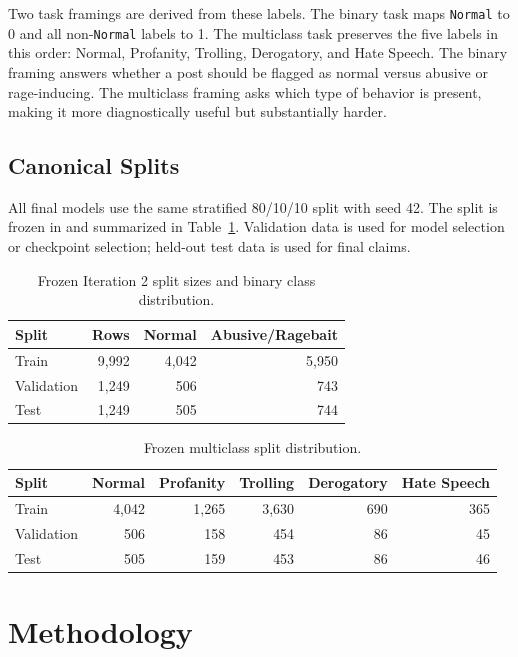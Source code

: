 \documentclass[11pt]{article}
\begin{document}
Two task framings are derived from these labels. The binary task maps \texttt{Normal} to 0 and all non-\texttt{Normal} labels to 1. The multiclass task preserves the five labels in this order: Normal, Profanity, Trolling, Derogatory, and Hate Speech. The binary framing answers whether a post should be flagged as normal versus abusive or rage-inducing. The multiclass framing asks which type of behavior is present, making it more diagnostically useful but substantially harder.

\subsection{Canonical Splits}

All final models use the same stratified 80/10/10 split with seed 42. The split is frozen in  and summarized in Table~\ref{tab:splits}. Validation data is used for model selection or checkpoint selection; held-out test data is used for final claims.

\begin{table}[H]
\centering
\caption{Frozen Iteration 2 split sizes and binary class distribution.}
\label{tab:splits}
\begin{tabular}{lrrr}
\toprule
Split & Rows & Normal & Abusive/Ragebait \\
\midrule
Train & 9,992 & 4,042 & 5,950 \\
Validation & 1,249 & 506 & 743 \\
Test & 1,249 & 505 & 744 \\
\bottomrule
\end{tabular}
\end{table}

\begin{table}[H]
\centering
\caption{Frozen multiclass split distribution.}
\label{tab:multi-splits}
\begin{tabular}{lrrrrr}
\toprule
Split & Normal & Profanity & Trolling & Derogatory & Hate Speech \\
\midrule
Train & 4,042 & 1,265 & 3,630 & 690 & 365 \\
Validation & 506 & 158 & 454 & 86 & 45 \\
Test & 505 & 159 & 453 & 86 & 46 \\
\bottomrule
\end{tabular}
\end{table}

\section{Methodology}
\end{document}
